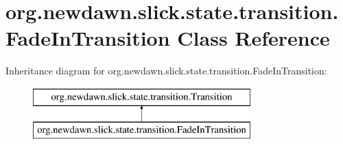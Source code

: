 \hypertarget{classorg_1_1newdawn_1_1slick_1_1state_1_1transition_1_1_fade_in_transition}{}\section{org.\+newdawn.\+slick.\+state.\+transition.\+Fade\+In\+Transition Class Reference}
\label{classorg_1_1newdawn_1_1slick_1_1state_1_1transition_1_1_fade_in_transition}
Inheritance diagram for org.\+newdawn.\+slick.\+state.\+transition.\+Fade\+In\+Transition\+:\begin{figure}[H]
\begin{center}
\leavevmode
\includegraphics[height=2.000000cm]{classorg_1_1newdawn_1_1slick_1_1state_1_1transition_1_1_fade_in_transition}
\end{center}
\end{figure}
